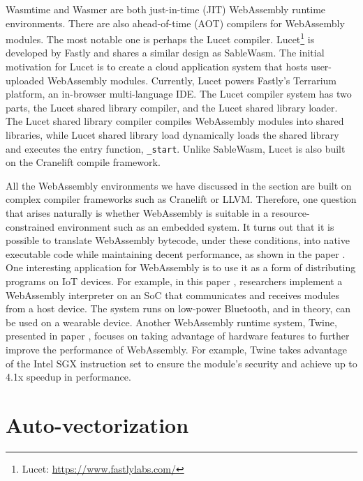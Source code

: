 Wasmtime and Wasmer are both just-in-time (JIT) WebAssembly runtime environments. There are also ahead-of-time (AOT) compilers for WebAssembly modules. The most notable one is perhaps the Lucet compiler. Lucet\footnote{Lucet: \url{https://www.fastlylabs.com/}} is developed by Fastly and shares a similar design as SableWasm. The initial motivation for Lucet is to create a cloud application system that hosts user-uploaded WebAssembly modules. Currently, Lucet powers Fastly's Terrarium platform, an in-browser multi-language IDE. The Lucet compiler system has two parts, the Lucet shared library compiler, and the Lucet shared library loader. The Lucet shared library compiler compiles WebAssembly modules into shared libraries, while Lucet shared library load dynamically loads the shared library and executes the entry function, \texttt{\_start}. Unlike SableWasm, Lucet is also built on the Cranelift compile framework.

All the WebAssembly environments we have discussed in the section are built on complex compiler frameworks such as Cranelift or LLVM. Therefore, one question that arises naturally is whether WebAssembly is suitable in a resource-constrained environment such as an embedded system. It turns out that it is possible to translate WebAssembly bytecode, under these conditions, into native executable code while maintaining decent performance, as shown in the paper \cite{webassembly-embedded}. One interesting application for WebAssembly is to use it as a form of distributing programs on IoT devices. For example, in this paper \cite{webassembly-wearables}, researchers implement a WebAssembly interpreter on an SoC that communicates and receives modules from a host device. The system runs on low-power Bluetooth, and in theory, can be used on a wearable device. Another WebAssembly runtime system, Twine, presented in paper \cite{webassembly-sgx}, focuses on taking advantage of hardware features to further improve the performance of WebAssembly. For example, Twine takes advantage of the Intel SGX instruction set to ensure the module's security and achieve up to 4.1x speedup in performance.

\section*{Auto-vectorization}

